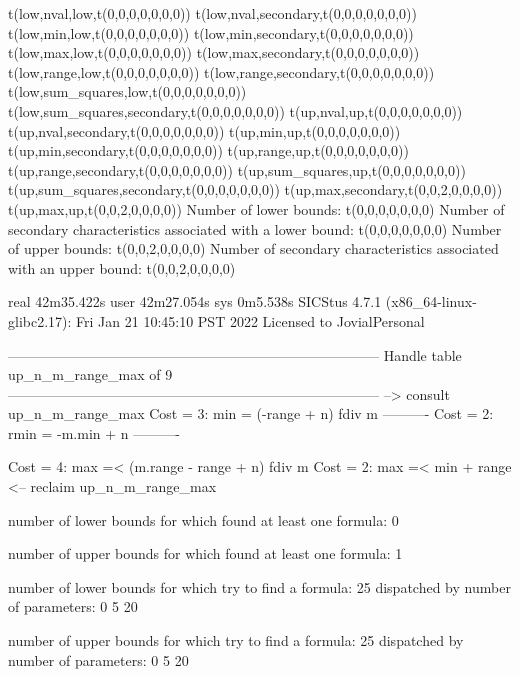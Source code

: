 t(low,nval,low,t(0,0,0,0,0,0,0))
t(low,nval,secondary,t(0,0,0,0,0,0,0))
t(low,min,low,t(0,0,0,0,0,0,0))
t(low,min,secondary,t(0,0,0,0,0,0,0))
t(low,max,low,t(0,0,0,0,0,0,0))
t(low,max,secondary,t(0,0,0,0,0,0,0))
t(low,range,low,t(0,0,0,0,0,0,0))
t(low,range,secondary,t(0,0,0,0,0,0,0))
t(low,sum_squares,low,t(0,0,0,0,0,0,0))
t(low,sum_squares,secondary,t(0,0,0,0,0,0,0))
t(up,nval,up,t(0,0,0,0,0,0,0))
t(up,nval,secondary,t(0,0,0,0,0,0,0))
t(up,min,up,t(0,0,0,0,0,0,0))
t(up,min,secondary,t(0,0,0,0,0,0,0))
t(up,range,up,t(0,0,0,0,0,0,0))
t(up,range,secondary,t(0,0,0,0,0,0,0))
t(up,sum_squares,up,t(0,0,0,0,0,0,0))
t(up,sum_squares,secondary,t(0,0,0,0,0,0,0))
t(up,max,secondary,t(0,0,2,0,0,0,0))
t(up,max,up,t(0,0,2,0,0,0,0))
Number of lower bounds:                                             t(0,0,0,0,0,0,0)
Number of secondary characteristics associated with a lower bound:  t(0,0,0,0,0,0,0)
Number of upper bounds:                                             t(0,0,2,0,0,0,0)
Number of secondary characteristics associated with an upper bound: t(0,0,2,0,0,0,0)

real	42m35.422s
user	42m27.054s
sys	0m5.538s
SICStus 4.7.1 (x86_64-linux-glibc2.17): Fri Jan 21 10:45:10 PST 2022
Licensed to JovialPersonal


--------------------------------------------------------------------------------
Handle table up_n_m_range_max of 9
--------------------------------------------------------------------------------
--> consult up_n_m_range_max
Cost =  3:  min  = (-range + n) fdiv m
----------
Cost =  2:  rmin = -m.min + n
----------

Cost =  4:  max =< (m.range - range + n) fdiv m
Cost =  2:  max =< min + range
<-- reclaim up_n_m_range_max

number of lower bounds for which found at least one formula: 0

number of upper bounds for which found at least one formula: 1

number of lower bounds for which try to find a formula: 25
dispatched by number of parameters: 0  5  20

number of upper bounds for which try to find a formula: 25
dispatched by number of parameters: 0  5  20

